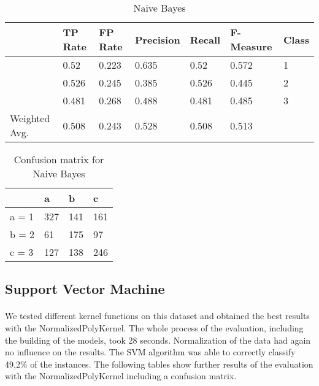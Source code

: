 \documentclass[paper=a4, fontsize=11pt]{scrartcl} %
\numberwithin{equation}{section} %
\numberwithin{figure}{section} %
\numberwithin{table}{section} %
\begin{document}
\begin{table*}[htb]\centering
  \begin{tabular*}{\columnwidth}{@{}lllllll@{}}
      \toprule 
               &  TP Rate & FP Rate & Precision & Recall & F-Measure & Class \\   \midrule
               &  0.52    & 0.223   & 0.635     & 0.52   & 0.572     & 1  \\  
               &  0.526   & 0.245   & 0.385     & 0.526  & 0.445     & 2  \\
               &  0.481   & 0.268   & 0.488     & 0.481  & 0.485     & 3  \\
Weighted Avg.  &  0.508   & 0.243   & 0.528     & 0.508  & 0.513     &    \\   \bottomrule
    \end{tabular*}
\caption{Naive Bayes} 
\label{tab:contra:bayes:1d}
\end{table*}



\begin{table}[h]
\centering
\begin{tabular}{|l|lll|}
\hline
              &   a &   b &   c  \\
\hline
 a = 1        & 327 & 141 & 161  \\
 b = 2        &  61 & 175 &  97  \\
 c = 3        & 127 & 138 & 246  \\
\hline
\end{tabular}
\caption{Confusion matrix for Naive Bayes}
\label{tab:contra:bayes:1c}
\end{table}


\subsection{Support Vector Machine}

\paragraph{}We tested different kernel functions on this dataset and obtained the best results with the NormalizedPolyKernel. The whole process of the evaluation, including the building of the models, took 28 seconds. Normalization of the data had again no influence on the results. The SVM algorithm was able to correctly classify 49,2\% of the instances. The following tables show further results of the evaluation with the NormalizedPolyKernel including a confusion matrix.
\end{document}
